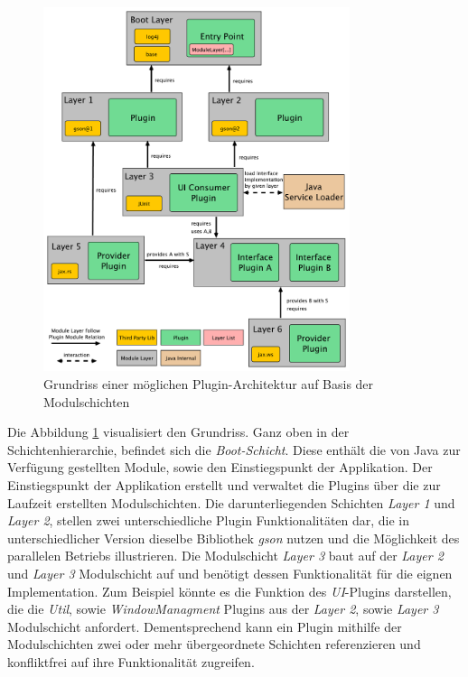 	\begin{figure}[t]
		   \centering
		   \captionsetup{justification=centering}
		   \includegraphics[width=0.8\textwidth]{material/images/ModulLayerDepsDraw.pdf}
		   \caption{Grundriss einer möglichen Plugin-Architektur auf Basis der Modulschichten}
		   \label{fig:ModSchichtKonzept}
	\end{figure}
\newpage	
	Die Abbildung \ref{fig:ModSchichtKonzept} visualisiert den Grundriss. Ganz oben in der Schichtenhierarchie, befindet sich die \textit{Boot-Schicht}. Diese enthält die von Java zur Verfügung gestellten Module, sowie den Einstiegspunkt der Applikation. Der Einstiegspunkt der Applikation erstellt und verwaltet die Plugins über die zur Laufzeit erstellten Modulschichten. Die darunterliegenden Schichten \textit{Layer 1} und \textit{Layer 2}, stellen zwei unterschiedliche Plugin Funktionalitäten dar, die in unterschiedlicher Version dieselbe Bibliothek \textit{gson} nutzen und die Möglichkeit des parallelen Betriebs illustrieren. Die Modulschicht \textit{Layer 3} baut auf der \textit{Layer 2} und \textit{Layer 3} Modulschicht auf und benötigt dessen Funktionalität für die eignen Implementation. Zum Beispiel könnte es die Funktion des \textit{UI}-Plugins darstellen, die die \textit{Util}, sowie \textit{WindowManagment} Plugins aus der \textit{Layer 2}, sowie \textit{Layer 3} Modulschicht anfordert. Dementsprechend kann ein Plugin mithilfe der Modulschichten zwei oder mehr übergeordnete Schichten referenzieren und konfliktfrei auf ihre Funktionalität zugreifen.\newline

